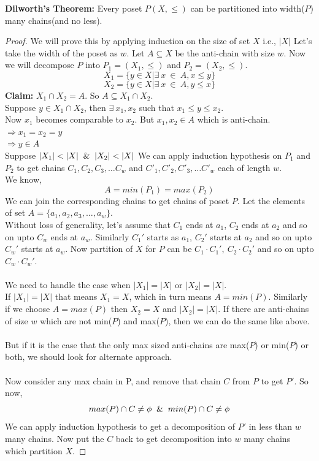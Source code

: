 \begin{theorem}
\textbf{Dilworth's Theorem:} Every poset $P(X,\leq)$ can be partitioned into width($P$) many chains(and no less).
\begin{proof}
We will prove this by applying induction on the size of set $X$ i.e., $|X|$
Let's take the width of the poset as $w$. Let $A \subseteq X$ be the anti-chain with size $w$. Now we will decompose $P$ into $P_1 = (X_1,\leq)$ and $P_2 = (X_2,\leq)$.
$$X_1 = \{y \in X | \exists~ x ~ \in ~ A, x \leq y\}$$
$$X_2 = \{y \in X | \exists~ x ~ \in ~ A, y \leq x\}$$
\textbf{Claim:} $X_1 \cap X_2 = A$. So $A \subseteq X_1 \cap X_2$.\\
Suppose $y \in X_1 \cap X_2$, then $\exists~ x_1, x_2$ such that $x_1 \leq y \leq x_2$.\\
Now $x_1$ becomes comparable to $x_2$. But $x_1, x_2 \in A$ which is anti-chain.\\
$\Rightarrow x_1 = x_2 = y$\\
$\Rightarrow y \in A$\\
Suppose $|X_1| < |X| \And |X_2| < |X|$
We can apply induction hypothesis on $P_1$ and $P_2$ to get chains $C_1, C_2, C_3, \ldots C_w$ and ${C'}_1, {C'}_2, {C'}_3, \ldots {C'}_w$ each of length $w$.\\
We know,\\
$$A = min(P_1) = max(P_2)$$
We can join the corresponding chains to get chains of poset $P$. Let the elements of set $A = \{a_1,a_2,a_3,\ldots,a_w\}$.\\
Without loss of generality, let's assume that $C_1$ ends at $a_1$, $C_2$ ends at $a_2$ and so on upto $C_w$ ends at $a_w$. Similarly $C_1'$ starts as $a_1$, $C_2'$ starts at $a_2$ and so on upto $C_w'$ starts at $a_w$. Now partition of $X$ for $P$ can be $C_1 \cdot {C_1'}, ~C_2 \cdot {C_2'}$ and so on upto $C_w \cdot {C_w'}$.\\\\
We need to handle the case when $|X_1| = |X|$ or $|X_2| = |X|$.\\
If $|X_1| = |X|$ that means $X_1 = X$, which in turn means $A = min(P)$. Similarly if we choose $A = max(P)$ then $X_2 = X$ and $|X_2| = |X|$. If there are anti-chains of size $w$ which are not min($P$) and max($P$), then we can do the same like above.\\\\
But if it is the case that the only max sized anti-chains are max($P$) or min($P$) or both, we should look for alternate approach.\\\\
Now consider any max chain in P, and remove that chain $C$ from $P$ to get $P'$. So now,\\
$$max(P) \cap C \neq \phi \And min(P) \cap C \neq \phi$$
We can apply induction hypothesis to get a decomposition of $P'$ in less than $w$ many chains. Now put the $C$ back to get decomposition into $w$ many chains which partition $X$.

\end{proof}
\end{theorem}

